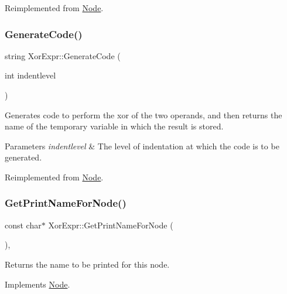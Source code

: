 Reimplemented from \hyperlink{class_node_a5f88d55c6f253a29def7ccc443d83d47}{Node}.

\mbox{\label{class_xor_expr_a527ab580326a7a6f40083de3c2d2a6a4}} 
\subsubsection{\texorpdfstring{Generate\+Code()}{GenerateCode()}}
{\footnotesize\ttfamily string Xor\+Expr\+::\+Generate\+Code (\begin{DoxyParamCaption}\item[{int}]{indentlevel }\end{DoxyParamCaption})\hspace{0.3cm}{\ttfamily [virtual]}}

Generates code to perform the xor of the two operands, and then returns the name of the temporary variable in which the result is stored. 
\begin{DoxyParams}{Parameters}
{\em indentlevel} & The level of indentation at which the code is to be generated. \\
\hline
\end{DoxyParams}


Reimplemented from \hyperlink{class_node_acb60e526730e8436056375a3055c2c32}{Node}.

\mbox{\label{class_xor_expr_a2620f3b842a78c700d5ea2b1e357ec26}} 
\subsubsection{\texorpdfstring{Get\+Print\+Name\+For\+Node()}{GetPrintNameForNode()}}
{\footnotesize\ttfamily const char$\ast$ Xor\+Expr\+::\+Get\+Print\+Name\+For\+Node (\begin{DoxyParamCaption}{ }\end{DoxyParamCaption})\hspace{0.3cm}{\ttfamily [inline]}, {\ttfamily [virtual]}}

Returns the name to be printed for this node. 

Implements \hyperlink{class_node_a56e29657306ffb004d69c6929ae44269}{Node}.

